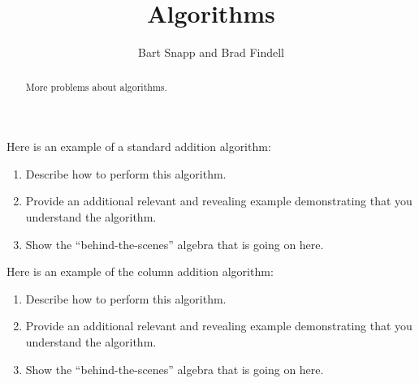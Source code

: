 \documentclass[nooutcomes]{ximera}
\title{Algorithms}
\author{Bart Snapp and Brad Findell}
\begin{document}
\begin{abstract}
More problems about algorithms. 
\end{abstract}
\maketitle


\begin{problem}Here is an example of a standard addition algorithm:
\begin{image}
\end{image}
\begin{enumerate}
\item Describe how to perform this algorithm.
\item Provide an additional relevant and revealing example
  demonstrating that you understand the algorithm.
\item Show the ``behind-the-scenes'' algebra that is going on here.
\end{enumerate}
\end{problem} 

\begin{problem}Here is an example of the column addition
  algorithm:
\begin{image}
\end{image}
\begin{enumerate}
\item Describe how to perform this algorithm.
\item Provide an additional relevant and revealing example
  demonstrating that you understand the algorithm.
\item Show the ``behind-the-scenes'' algebra that is going on here.
\end{enumerate}
\end{problem} 
\end{document}
